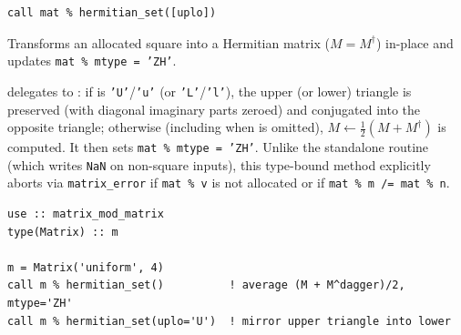 
\lstset{language=[95]Fortran}
\begin{lstlisting}
call mat % hermitian_set([uplo])
\end{lstlisting}

Transforms an allocated square  into a Hermitian matrix ($M = M^\dagger$) in-place and updates \texttt{mat \% mtype = 'ZH'}.

 delegates to : if  is \texttt{'U'}/\texttt{'u'} (or \texttt{'L'}/\texttt{'l'}), the upper (or lower) triangle is preserved (with diagonal imaginary parts zeroed) and conjugated into the opposite triangle; otherwise (including when  is omitted), $M \leftarrow \frac{1}{2}(M + M^\dagger)$ is computed. It then sets \texttt{mat \% mtype = 'ZH'}. Unlike the standalone  routine (which writes \texttt{NaN} on non-square inputs), this type-bound method explicitly aborts via \texttt{matrix\_error} if \texttt{mat \% v} is not allocated or if \texttt{mat \% m /= mat \% n}.

\begin{description}[leftmargin=2.2cm, style=nextline]
\end{description}

\lstset{language=[95]Fortran}
\begin{lstlisting}
use :: matrix_mod_matrix
type(Matrix) :: m

m = Matrix('uniform', 4)
call m % hermitian_set()          ! average (M + M^dagger)/2, mtype='ZH'
call m % hermitian_set(uplo='U')  ! mirror upper triangle into lower
\end{lstlisting}


